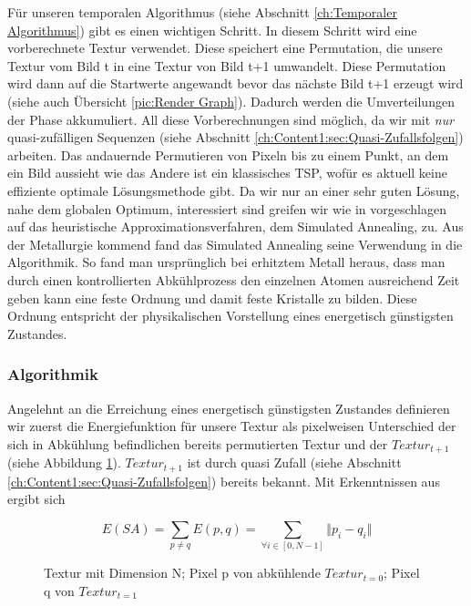 Für unseren temporalen Algorithmus (siehe Abschnitt \ref{ch:Temporaler Algorithmus}) gibt es einen wichtigen  Schritt.
In diesem Schritt wird eine vorberechnete Textur verwendet. Diese speichert eine Permutation, die unsere  Textur vom Bild t in eine
 Textur von Bild t+1 umwandelt. Diese Permutation wird dann auf die Startwerte angewandt bevor das nächste Bild t+1 erzeugt wird 
(siehe auch Übersicht \ref{pic:Render Graph}). Dadurch werden die  Umverteilungen der  Phase akkumuliert. 
All diese Vorberechnungen sind möglich, da wir mit \textit{\glqq nur\grqq} quasi-zufälligen Sequenzen (siehe Abschnitt \ref{ch:Content1:sec:Quasi-Zufallsfolgen}) arbeiten.
Das andauernde Permutieren von Pixeln bis zu einem Punkt, an dem ein Bild aussieht wie das Andere ist ein klassisches TSP, wofür es aktuell keine effiziente optimale Lösungsmethode gibt.
Da wir nur an einer sehr guten Lösung, nahe dem globalen Optimum, interessiert sind greifen wir wie in \cite{hal02158423} vorgeschlagen auf das heuristische Approximationsverfahren,
dem Simulated Annealing, zu.
Aus der Metallurgie kommend fand das Simulated Annealing seine Verwendung in die Algorithmik. So fand man ursprünglich bei erhitztem Metall heraus, dass man durch einen 
kontrollierten Abkühlprozess den einzelnen Atomen ausreichend Zeit geben kann eine feste Ordnung und damit feste Kristalle zu bilden. Diese Ordnung entspricht der 
physikalischen Vorstellung eines energetisch günstigsten Zustandes.

\subsubsection{Algorithmik}

Angelehnt an die Erreichung eines energetisch günstigsten Zustandes definieren wir zuerst die Energiefunktion für unsere Textur als pixelweisen Unterschied
der sich in Abkühlung 
befindlichen bereits permutierten Textur und der $Textur_{t+1}$ (siehe Abbildung \ref{eq:pixel energy function}). $Textur_{t+1}$ ist durch quasi Zufall (siehe Abschnitt
\ref{ch:Content1:sec:Quasi-Zufallsfolgen}) bereits bekannt. Mit Erkenntnissen aus\cite{georgiev2016blue} ergibt sich

\begin{figure}[H]
    \begin{tcolorbox}[rightrule=3mm, rounded corners=east]
    \[ E(SA) = \sum_{p \neq q}E(p,q) = \sum_{\forall i \in [0,N-1]} \Vert{p_{i}-q_{i}}\Vert \]
    \end{tcolorbox}
    \caption{ Textur mit Dimension N; Pixel p von abkühlende 
    $Textur_{t=0}$; Pixel q von $Textur_{t=1}$}
    \label{eq:pixel energy function}
\end{figure}

